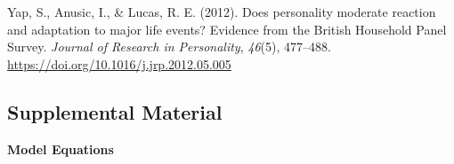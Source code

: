 \documentclass[
  english,
  man, noextraspace]{apa7}
\begin{document}
\leavevmode\hypertarget{ref-yapDoesPersonalityModerate2012}{}%
Yap, S., Anusic, I., \& Lucas, R. E. (2012). Does personality moderate reaction and adaptation to major life events? Evidence from the British Household Panel Survey. \emph{Journal of Research in Personality}, \emph{46}(5), 477--488. \url{https://doi.org/10.1016/j.jrp.2012.05.005}

\endgroup


\clearpage
\makeatletter
\efloat@restorefloats
\makeatother


\begin{appendix}
\renewcommand{\appendixname}{\textcolor{white}{.}}

\hypertarget{supplemental-material}{%
\section{Supplemental Material}\label{supplemental-material}}

\renewcommand{\thefigure}{S\arabic{figure}} \setcounter{figure}{0}
\renewcommand{\thetable}{S\arabic{table}} \setcounter{table}{0}

\setcounter{page}{1}

\noindent \textbf{Model Equations}


\end{appendix}
\end{document}
